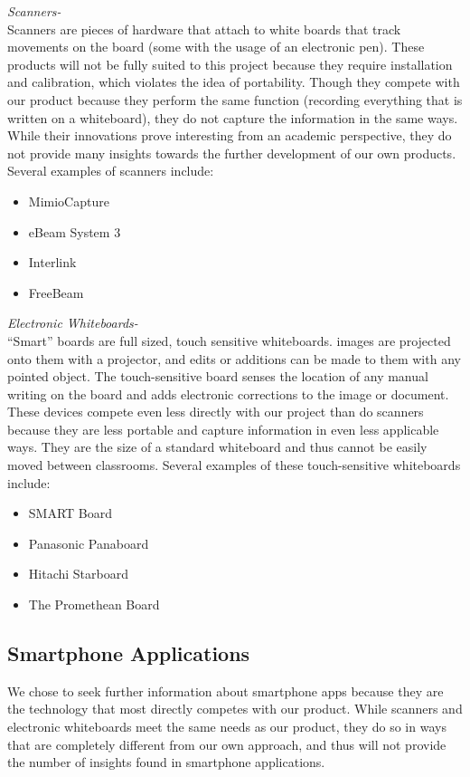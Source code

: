 \documentclass{article}
\begin{document}
			
			\noindent \emph{Scanners-}\\
Scanners are pieces of hardware that attach to white boards that track movements on the board (some with the usage of an electronic pen). These products will not be fully suited to this project because they require installation and calibration, which violates the idea of portability. Though they compete with our product because they perform the same function (recording everything that is written on a whiteboard), they do not capture the information in the same ways. While their innovations prove interesting from an academic perspective, they do not provide many insights towards the further development of our own products. Several examples of scanners include:
			\begin{itemize}
				\item MimioCapture
				\item eBeam System 3
				\item Interlink
				\item FreeBeam
			\end{itemize}
			
			
			
			
		
		\noindent \emph{Electronic Whiteboards-} \\
``Smart'' boards are full sized, touch sensitive whiteboards. images are projected onto them with a projector, and edits or additions can be made to them with any pointed object. The touch-sensitive board senses the location of any manual writing on the board and adds electronic corrections to the image or document. These devices compete even less directly with our project than do scanners because they are less portable and capture information in even less applicable ways. They are the size of a standard whiteboard and thus cannot be easily moved between classrooms. Several examples of these touch-sensitive whiteboards include:
            \begin{itemize}
                \item SMART Board
                \item Panasonic Panaboard
                \item Hitachi Starboard
                \item The Promethean Board
            \end{itemize}
			
			\subsection*{Smartphone Applications}
We chose to seek further information about smartphone apps because they are the technology that most directly competes with our product. While scanners and electronic whiteboards meet the same needs as our product, they do so in ways that are completely different from our own approach, and thus will not provide the number of insights found in smartphone applications. \\
\end{document}
